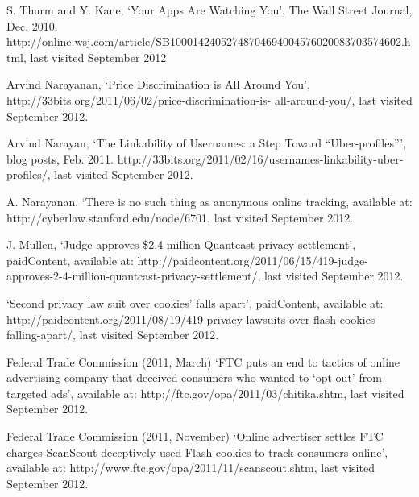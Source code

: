 \begin{thebibliography}{50}

 S. Thurm and Y. Kane, ‘Your Apps Are Watching You’, The Wall Street Journal, Dec.
2010. http://online.wsj.com/article/SB10001424052748704694004576020083703574602.html, last visited September 2012

 Arvind Narayanan, ‘Price Discrimination is All Around You’, http://33bits.org/2011/06/02/price-discrimination-is-
all-around-you/, last visited September 2012.

 Arvind Narayan, ‘The Linkability of Usernames: a Step Toward “Uber-profiles”’, blog posts, Feb.
2011. http://33bits.org/2011/02/16/usernames-linkability-uber-profiles/, last visited September 2012.

 A. Narayanan. ‘There is no such thing as anonymous online tracking, available at: http://cyberlaw.stanford.edu/node/6701, last visited September 2012.

 J. Mullen, ‘Judge approves \$2.4 million Quantcast privacy settlement’, paidContent, available
at: http://paidcontent.org/2011/06/15/419-judge-approves-2-4-million-quantcast-privacy-settlement/, last visited September
2012.

 ‘Second privacy law suit over cookies’ falls apart’, paidContent, available at: http://paidcontent.org/2011/08/19/419-privacy-lawsuits-over-flash-cookies-falling-apart/, last visited September 2012.

 Federal Trade Commission (2011, March) ‘FTC puts an end to tactics of online advertising company that deceived
consumers who wanted to ‘opt out’ from targeted ads’, available at: http://ftc.gov/opa/2011/03/chitika.shtm, last visited
September 2012.

 Federal Trade Commission (2011, November) ‘Online advertiser settles FTC charges ScanScout deceptively used
Flash cookies to track consumers online’, available at: http://www.ftc.gov/opa/2011/11/scanscout.shtm, last visited
September 2012.

\end{thebibliography}
